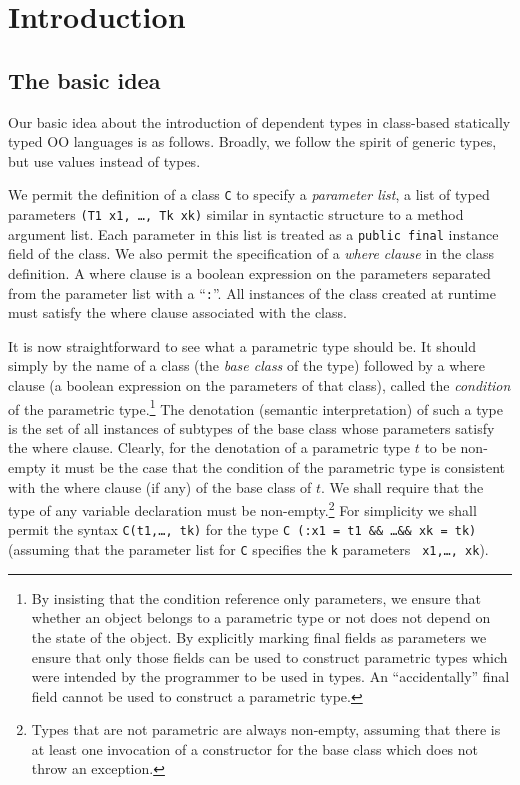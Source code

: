 \documentclass[fullpage]{article}
\begin{document}
\section{Introduction}
\subsection{The basic idea}

Our basic idea about the introduction of dependent types in
class-based statically typed OO languages is as follows. Broadly, we
follow the spirit of generic types, but use values instead of
types. 

We permit the definition of a class {\tt C} to specify a {\em
parameter list}, a list of typed parameters {\tt (T1 x1, \ldots, Tk
xk)} similar in syntactic structure to a method argument list. Each
parameter in this list is treated as a {\tt public final} instance
field of the class. We also permit the specification of a {\em where
clause} in the class definition. A where clause is a boolean
expression on the parameters separated from the parameter list with a
``{\tt :}''.  All instances of the class created at runtime must
satisfy the where clause associated with the class.

It is now straightforward to see what a parametric type should be.  It
should simply by the name of a class (the {\em base class} of the
type) followed by a where clause (a boolean expression on the
parameters of that class), called the {\em condition} of the
parametric type.\footnote{By insisting that the condition reference
only parameters, we ensure that whether an object belongs to a
parametric type or not does not depend on the state of the object. By
explicitly marking final fields as parameters we ensure that only
those fields can be used to construct parametric types which were
intended by the programmer to be used in types. An ``accidentally''
final field cannot be used to construct a parametric type.}  The
denotation (semantic interpretation) of such a type is the set of all
instances of subtypes of the base class whose parameters satisfy the
where clause. Clearly, for the denotation of a parametric type $t$ to
be non-empty it must be the case that the condition of the parametric
type is consistent with the where clause (if any) of the base class of
$t$. We shall require that the type of any variable declaration must
be non-empty.\footnote{Types that are not parametric are always
non-empty, assuming that there is at least one invocation of a
constructor for the base class which does not throw an exception.} For
simplicity we shall permit the syntax {\tt C(t1,\ldots, tk)} for the
type {\tt C (:x1 = t1 \&\& \ldots \&\& xk = tk)} (assuming that the
parameter list for {\tt C} specifies the {\tt k} parameters {\tt
x1,\ldots, xk}).
\end{document}
